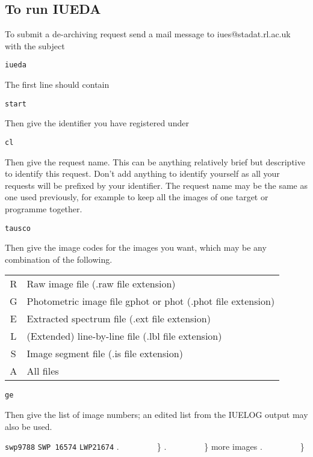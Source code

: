 \documentclass[11pt,twoside,nolof,noabs]{starlink}
\begin{document}
\subsection{To run IUEDA}

To submit a de-archiving request
send a mail message to iues@stadat.rl.ac.uk with the subject

\texttt{iueda}

The first line should contain

\texttt{start}

Then give the identifier you have registered under

\texttt{cl}

Then give the request name. This can be anything relatively brief but
descriptive to identify this request. Don't add anything to identify
yourself as all your requests will be prefixed by your identifier.
The request name may be the same as one used previously, for example to keep
all the images of one target or programme together.

\texttt{tausco}

Then give the image codes for the images you want, which may be any combination
of the following.
\label{codes}
\begin{center}
\begin{tabular}{cl}
R & Raw image file (.raw file extension) \\
G & Photometric image file gphot or phot (.phot file extension) \\
E & Extracted spectrum file (.ext file extension) \\
L & (Extended) line-by-line file (.lbl file extension) \\
S & Image segment file (.is file extension) \\
A & All files \\

\end{tabular}
\end{center}

\texttt{ge}

Then give the list of image numbers; an edited list from the IUELOG output may
also be used.

\texttt{swp9788}
\newline
\texttt{SWP 16574}
\newline
\texttt{LWP21674}
\newline
.~~~~~~~~~\}
\newline
.~~~~~~~~~\} more images
\newline
.~~~~~~~~~\}
\end{document}
